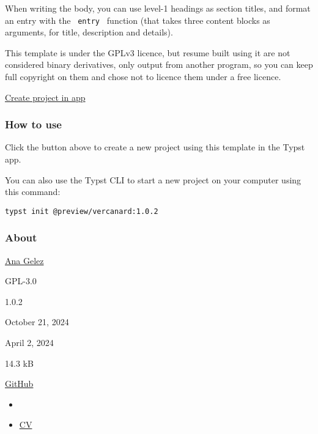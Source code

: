 When writing the body, you can use level-1 headings as section titles,
and format an entry with the \texttt{\ entry\ } function (that takes
three content blocks as arguments, for title, description and details).

\begin{Shaded}
\begin{Highlighting}[]

\end{Highlighting}
\end{Shaded}

This template is under the GPLv3 licence, but resume built using it are
not considered binary derivatives, only output from another program, so
you can keep full copyright on them and chose not to licence them under
a free licence.

\href{/app?template=vercanard&version=1.0.2}{Create project in app}

\subsubsection{How to use}\label{how-to-use}

Click the button above to create a new project using this template in
the Typst app.

You can also use the Typst CLI to start a new project on your computer
using this command:

\begin{verbatim}
typst init @preview/vercanard:1.0.2
\end{verbatim}



\subsubsection{About}\label{about}

\begin{description}
\tightlist
\item[Author :]
\href{https://ana.gelez.xyz}{Ana Gelez}
\item[License:]
GPL-3.0
\item[Current version:]
1.0.2
\item[Last updated:]
October 21, 2024
\item[First released:]
April 2, 2024
\item[Archive size:]
14.3 kB
\href{https://packages.typst.org/preview/vercanard-1.0.2.tar.gz}{\pandocbounded{}}
\item[Repository:]
\href{https://github.com/elegaanz/vercanard}{GitHub}
\item[Categor y :]
\begin{itemize}
\tightlist
\item[]
\item
  \pandocbounded{}
  \href{https://typst.app/universe/search/?category=cv}{CV}
\end{itemize}
\end{description}

